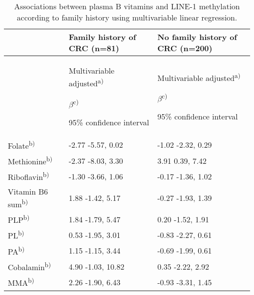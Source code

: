 \begin{table}
\small
\caption{Associations between plasma B vitamins and LINE-1 methylation according to family history using multivariable linear regression.}
\label{table5_3}
\begin{adjustbox}{width=\textwidth}
\begin{tabular}{C{3cm}C{4.5cm}C{4.6cm}}

\hline ~ & \bfseries Family history of CRC (n=81) & %
\bfseries No family history of CRC (n=200)\\
\hline ~ & { Multivariable adjusted\textsuperscript{a)}}

{ $\beta $\textsuperscript{c)}}

 95\% confidence interval & { Multivariable adjusted\textsuperscript{a)}}

{ $\beta $\textsuperscript{c)}}

 95\% confidence interval\\
\hline
 Folate\textsuperscript{b)} & { {}-2.77} {}-5.57, 0.02 & { {}-1.02} {}-2.32, 0.29\\
\hline
 Methionine\textsuperscript{b)} & { {}-2.37} {}-8.03, 3.30 & { 3.91} 0.39, 7.42\\
\hline
 Riboflavin\textsuperscript{b)} & { {}-1.30} {}-3.66, 1.06 & { {}-0.17} {}-1.36, 1.02\\
\hline
 Vitamin B6 sum\textsuperscript{b)} & { 1.88} {}-1.42, 5.17 & { {}-0.27} {}-1.93, 1.39\\
\hline
 PLP\textsuperscript{b)} & { 1.84} {}-1.79, 5.47 & { 0.20} {}-1.52, 1.91\\
\hline
 PL\textsuperscript{b)} & { 0.53} {}-1.95, 3.01 & { {}-0.83} {}-2.27, 0.61\\
\hline
 PA\textsuperscript{b)} & { 1.15} {}-1.15, 3.44 & { {}-0.69} {}-1.99, 0.61\\
\hline
 Cobalamin\textsuperscript{b)} & { 4.90} {}-1.03, 10.82 & { 0.35} {}-2.22, 2.92\\
\hline
 MMA\textsuperscript{b)} & { 2.26} {}-1.90, 6.43 & { {}-0.93} {}-3.31, 1.45\\
\hline
\end{tabular}
\end{adjustbox}
\end{table}

